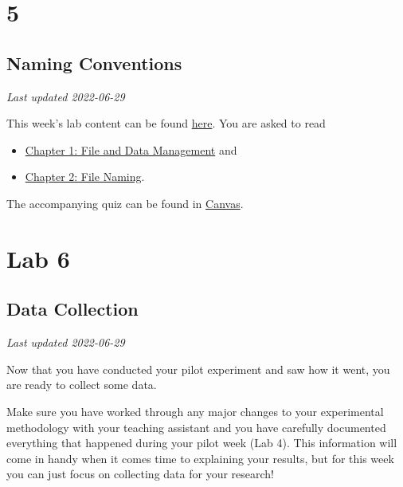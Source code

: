 \documentclass[
]{book}
\providecommand{\tightlist}{%
  \setlength{\itemsep}{0pt}\setlength{\parskip}{0pt}}
\begin{document}
\hypertarget{part-5}{%
\part*{5}\label{part-5}}

\hypertarget{naming-conventions}{%
\chapter*{Naming Conventions}\label{naming-conventions}}

\emph{Last updated 2022-06-29}

This week's lab content can be found \href{https://ubco-biology.github.io/Procedures-and-Guidelines/file-and-data-management.html}{here}. You are asked to read

\begin{itemize}
\tightlist
\item
  \href{https://ubco-biology.github.io/Procedures-and-Guidelines/file-and-data-management.html}{Chapter 1: File and Data Management} and
\item
  \href{https://ubco-biology.github.io/Procedures-and-Guidelines/file-naming.html}{Chapter 2: File Naming}.
\end{itemize}

The accompanying quiz can be found in \href{https://canvas.ubc.ca}{Canvas}.

\hypertarget{part-lab-6}{%
\part*{Lab 6}\label{part-lab-6}}

\hypertarget{data-collection}{%
\chapter*{Data Collection}\label{data-collection}}

\emph{Last updated 2022-06-29}

Now that you have conducted your pilot experiment and saw how it went, you are ready to collect some data.

Make sure you have worked through any major changes to your experimental methodology with your teaching assistant and you have carefully documented everything that happened during your pilot week (Lab 4). This information will come in handy when it comes time to explaining your results, but for this week you can just focus on collecting data for your research!
\end{document}
